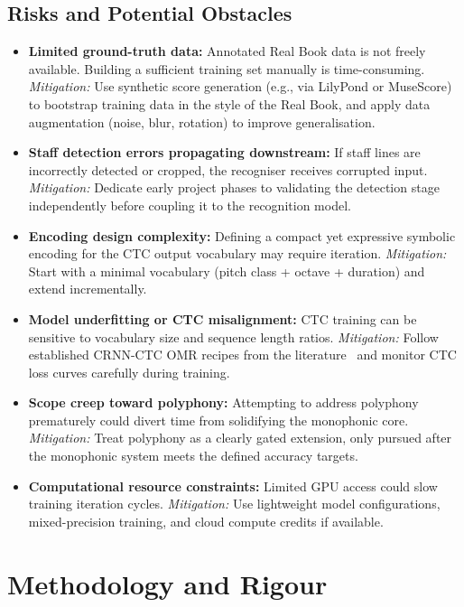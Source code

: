 \documentclass[11pt, a4paper]{article}
\begin{document}
\subsection{Risks and Potential Obstacles}
\begin{itemize}
    \item \textbf{Limited ground-truth data:} Annotated Real Book data is not freely available. Building a sufficient training set manually is time-consuming. \textit{Mitigation:} Use synthetic score generation (e.g., via LilyPond or MuseScore) to bootstrap training data in the style of the Real Book, and apply data augmentation (noise, blur, rotation) to improve generalisation.
    \item \textbf{Staff detection errors propagating downstream:} If staff lines are incorrectly detected or cropped, the recogniser receives corrupted input. \textit{Mitigation:} Dedicate early project phases to validating the detection stage independently before coupling it to the recognition model.
    \item \textbf{Encoding design complexity:} Defining a compact yet expressive symbolic encoding for the CTC output vocabulary may require iteration. \textit{Mitigation:} Start with a minimal vocabulary (pitch class + octave + duration) and extend incrementally.
    \item \textbf{Model underfitting or CTC misalignment:} CTC training can be sensitive to vocabulary size and sequence length ratios. \textit{Mitigation:} Follow established CRNN-CTC OMR recipes from the literature~\cite{PrIMuSDataset,opticalmusicrecognitionresearchSelfLearningOpticalMusic2019} and monitor CTC loss curves carefully during training.
    \item \textbf{Scope creep toward polyphony:} Attempting to address polyphony prematurely could divert time from solidifying the monophonic core. \textit{Mitigation:} Treat polyphony as a clearly gated extension, only pursued after the monophonic system meets the defined accuracy targets.
    \item \textbf{Computational resource constraints:} Limited GPU access could slow training iteration cycles. \textit{Mitigation:} Use lightweight model configurations, mixed-precision training, and cloud compute credits if available.
\end{itemize}

\section{Methodology and Rigour}
\label{sec:methodology}
\end{document}

